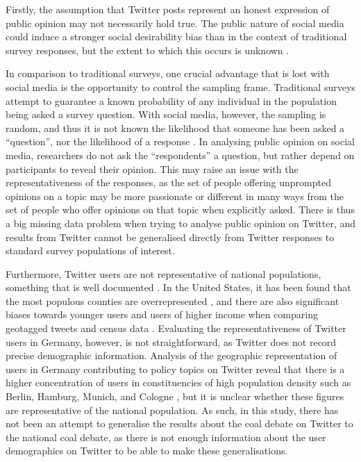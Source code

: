 \documentclass[12pt,onecolumn,twoside]{layout}
\begin{document}
Firstly, the assumption that Twitter posts represent an honest expression of public opinion may not necessarily hold true. The public nature of social media could induce a stronger social desirability bias than in the context of traditional survey responses, but the extent to which this occurs is unknown \citep{Klasnja2018}.

In comparison to traditional surveys, one crucial advantage that is lost with social media is the opportunity to control the sampling frame. Traditional surveys attempt to guarantee a known probability of any individual in the population being asked a survey question. With social media, however, the sampling is random, and thus it is not known the likelihood that someone has been asked a ``question'', nor the likelihood of a response \citep{Klasnja2018}. In analysing public opinion on social media, researchers do not ask the ``respondents'' a question, but rather depend on participants to reveal their opinion. This may raise an issue with the representativeness of the responses, as the set of people offering unprompted opinions on a topic may be more passionate or different in many ways from the set of people who offer opinions on that topic when explicitly asked. There is thus a big missing data problem when trying to analyse public opinion on Twitter, and results from Twitter cannot be generalised directly from Twitter responses to standard survey populations of interest.

Furthermore, Twitter users are not representative of national populations, something that is well documented \citep{Duggan2015, Mislove2011, Malik2015}. In the United States, it has been found that the most populous counties are overrepresented \citep{Mislove2011}, and there are also significant biases towards younger users and users of higher income when comparing geotagged tweets and census data \citep{Malik2015}. Evaluating the representativeness of Twitter users in Germany, however, is not straightforward, as Twitter does not record precise demographic information. Analysis of the geographic representation of users in Germany contributing to policy topics on Twitter reveal that there is a higher concentration of users in constituencies of high population density such as Berlin, Hamburg, Munich, and Cologne \citep{Fernandez2014}, but it is unclear whether these figures are representative of the national population. As such, in this study, there has not been an attempt to generalise the results about the coal debate on Twitter to the national coal debate, as there is not enough information about the user demographics on Twitter to be able to make these generalisations.
\end{document}

